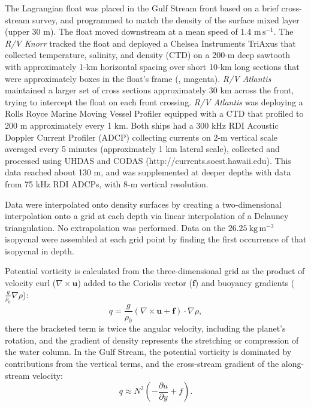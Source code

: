 \documentclass{natureJMK}
\begin{document}
The Lagrangian float was placed in the Gulf Stream front based on a brief cross-stream survey, and programmed to match the density of the surface mixed layer (upper 30 m).  The float moved downstream at a mean speed of 1.4 $\mathrm{m\,s^{-1}}$.  The \emph{R/V Knorr} tracked the float and deployed a Chelsea Instruments TriAxus that  collected temperature, salinity, and density (CTD) on a 200-m deep sawtooth with approximately 1-km horizontal spacing over short 10-km long sections that were approximately boxes in the float's frame (, magenta).  \emph{R/V Atlantis} maintained a larger set of cross sections approximately 30 km across the front, trying to intercept the float on each front crossing.  \emph{R/V Atlantis} was deploying a Rolls Royce Marine Moving Vessel Profiler equipped with a CTD that profiled to 200 m approximately every 1 km.  Both ships had a 300 kHz RDI Acoustic Doppler Current Profiler (ADCP) collecting currents on 2-m vertical scale averaged every 5 minutes (approximately 1 km lateral scale), collected and processed using UHDAS and CODAS (http://currents.soest.hawaii.edu\cite{firingetal12}).  This data reached about 130 m, and was supplemented at deeper depths with data from 75 kHz RDI ADCPs, with 8-m vertical resolution.  

Data were interpolated onto density surfaces by creating a two-dimensional interpolation onto a grid at each depth via linear interpolation of a Delauney triangulation. No extrapolation was performed.  Data on the $26.25\ \mathrm{kg\,m^{-3}}$ isopycnal were assembled at each grid point by finding the first occurrence of that isopycnal in depth.  

Potential vorticity is calculated from the three-dimensional grid as the product of velocity curl ($\nabla\times\mathbf{u}$) added to the Coriolis vector ($\mathbf{f}$) and buoyancy gradients ($\frac{g}{\rho_0}\nabla\rho$):
\begin{equation}
  q = \frac{g}{\rho_0}\left(\nabla\times\mathbf{u}+\mathbf{f}\right) \cdot \nabla\rho,
\end{equation}
there the bracketed term is twice the angular velocity, including the planet's rotation, and the gradient of density represents the stretching or compression of the water column.  In the Gulf Stream, the potential vorticity is dominated by contributions from the vertical terms, and the cross-stream gradient of the along-stream velocity:
\begin{equation}
  q \approx N^2\left(-\frac{\partial u}{\partial y}+f\right).
\end{equation}
\end{document}
